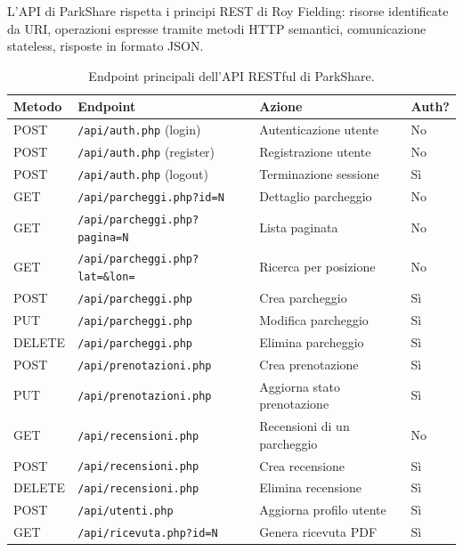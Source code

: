 \documentclass[12pt, a4paper]{article}
\begin{document}
L'API di ParkShare rispetta i principi REST di Roy Fielding: risorse identificate da
URI, operazioni espresse tramite metodi HTTP semantici, comunicazione stateless,
risposte in formato JSON.

\begin{table}[H]
\centering
\caption{Endpoint principali dell'API RESTful di ParkShare.}
\renewcommand{\arraystretch}{1.3}
\begin{tabular}{llll}
\toprule
\textbf{Metodo} & \textbf{Endpoint} & \textbf{Azione} & \textbf{Auth?} \\
\midrule
POST & \texttt{/api/auth.php} (login)     & Autenticazione utente      & No  \\
POST & \texttt{/api/auth.php} (register)  & Registrazione utente       & No  \\
POST & \texttt{/api/auth.php} (logout)    & Terminazione sessione       & Sì  \\
GET  & \texttt{/api/parcheggi.php?id=N}   & Dettaglio parcheggio       & No  \\
GET  & \texttt{/api/parcheggi.php?pagina=N}& Lista paginata             & No  \\
GET  & \texttt{/api/parcheggi.php?lat=\&lon=}& Ricerca per posizione   & No  \\
POST & \texttt{/api/parcheggi.php}        & Crea parcheggio            & Sì  \\
PUT  & \texttt{/api/parcheggi.php}        & Modifica parcheggio        & Sì  \\
DELETE & \texttt{/api/parcheggi.php}      & Elimina parcheggio         & Sì  \\
POST & \texttt{/api/prenotazioni.php}     & Crea prenotazione          & Sì  \\
PUT  & \texttt{/api/prenotazioni.php}     & Aggiorna stato prenotazione& Sì  \\
GET  & \texttt{/api/recensioni.php}       & Recensioni di un parcheggio& No  \\
POST & \texttt{/api/recensioni.php}       & Crea recensione            & Sì  \\
DELETE & \texttt{/api/recensioni.php}     & Elimina recensione         & Sì  \\
POST & \texttt{/api/utenti.php}           & Aggiorna profilo utente    & Sì  \\
GET  & \texttt{/api/ricevuta.php?id=N}    & Genera ricevuta PDF        & Sì  \\
\bottomrule
\end{tabular}
\end{table}
\end{document}
